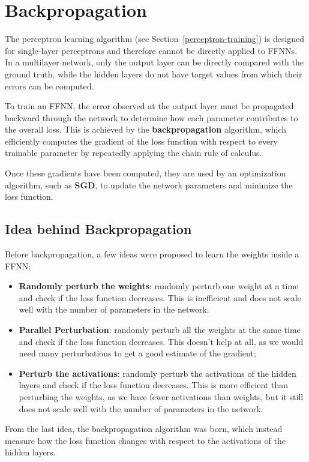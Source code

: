\section{Backpropagation}
The perceptron learning algorithm (see Section~\ref{perceptron-training}) is designed for single-layer perceptrons and therefore cannot be directly applied to FFNNs.
In a multilayer network, only the output layer can be directly compared with the ground truth, while the hidden layers do not have target values from which their errors can be computed.

To train an FFNN, the error observed at the output layer must be propagated backward through the network to determine how each parameter contributes to the overall loss.
This is achieved by the \textbf{backpropagation} algorithm, which efficiently computes the gradient of the loss function with respect to every trainable parameter by repeatedly applying the chain rule of calculus.

Once these gradients have been computed, they are used by an optimization algorithm, such as \textbf{SGD}, to update the network parameters and minimize the loss function.

\subsection{Idea behind Backpropagation}
Before backpropagation, a few ideas were proposed to learn the weights inside a FFNN:
\begin{itemize}
    \item \textbf{Randomly perturb the weights}: randomly perturb one weight at a time and check
    if the loss function decreases. This is inefficient and does not scale well with the number of parameters in the network.
    \item \textbf{Parallel Perturbation}: randomly perturb all the weights at the same time and check if the loss function decreases.
    This doesn't help at all, as we would need many perturbations to get a good estimate of the gradient;
    \item \textbf{Perturb the activations}: randomly perturb the activations of the hidden layers and check if the loss function decreases.
    This is more efficient than perturbing the weights, as we have fewer activations than weights, but it still does not scale well with the number of parameters in the network.
\end{itemize}
From the last idea, the backpropagation algorithm was born, which instead measure how the loss function changes with respect to the activations of the hidden layers.

